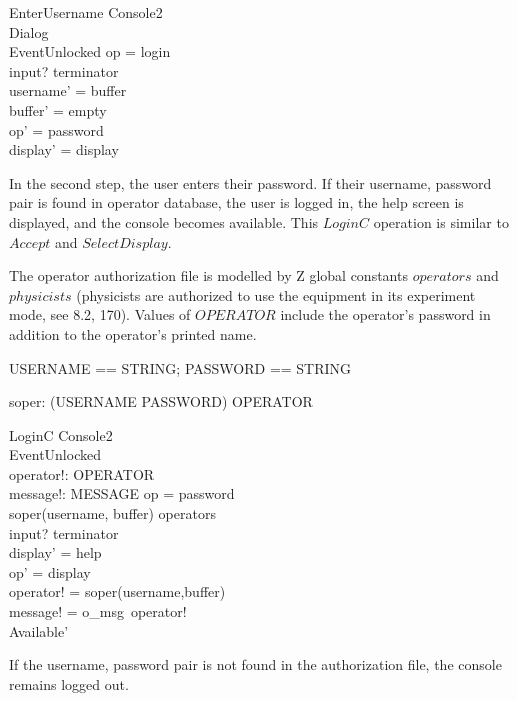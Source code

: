 \begin{schema}{EnterUsername}
	\Delta Console2 \\
	\Delta Dialog \\
	EventUnlocked
\where
	op = login \\
	input? \in terminator \\
	username' = buffer \\
	buffer' = empty \\
	op' = password \\
  	display' = display \\
\end{schema}
In the second step, the user enters their password.  If their
username, password pair is found in operator database, the user is
logged in, the help screen is displayed, and the console becomes
available.  This $LoginC$ operation is similar to $Accept$ and
$SelectDisplay$.

The operator authorization file is modelled by Z global constants
$operators$ and $physicists$ (physicists are authorized to use the
equipment in its experiment mode, see 8.2, 170).  Values of $OPERATOR$
include the operator's password in addition to the operator's printed
name.

\begin{zed} USERNAME == STRING; PASSWORD == STRING \end{zed}

\begin{axdef}
	soper: (USERNAME \cross PASSWORD) \fun OPERATOR \\
\end{axdef}

\begin{schema}{LoginC}
	\Delta Console2 \\
	EventUnlocked \\
	operator!: OPERATOR \\
	message!: MESSAGE
\where	
	op = password \\
	soper(username, buffer) \in operators \\
	input? \in terminator \\
	display' = help \\
	op' = display \\
	operator! = soper(username,buffer) \\
	message! = o\_msg~operator! \\
	Available'
\end{schema}
If the username, password pair is not found in the authorization file,
the console remains logged out.  

